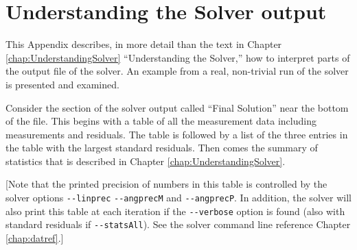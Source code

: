 \chapter{Understanding the Solver output}
\label{chap:solverout}

This Appendix describes, in more detail than the text in Chapter \ref{chap:UnderstandingSolver} ``Understanding the Solver,'' how to interpret parts of the output file of the solver. An example from a real, non-trivial run of the solver is presented and examined.

Consider the section of the solver output called ``Final Solution'' near the bottom of the file. This begins with a table of all the measurement data including measurements and residuals. The table is followed by a list of the three entries in the table with the largest standard residuals. Then comes the summary of statistics that is described in Chapter \ref{chap:UnderstandingSolver}.

[Note that the printed precision of numbers in this table is controlled by the solver options \verb+--linprec+ \verb+--angprecM+ and \verb+--angprecP+. In addition, the solver will also print this table at each iteration if the \verb+--verbose+ option is found (also with standard residuals if \verb+--statsAll+). See the solver command line reference Chapter \ref{chap:datref}.]

